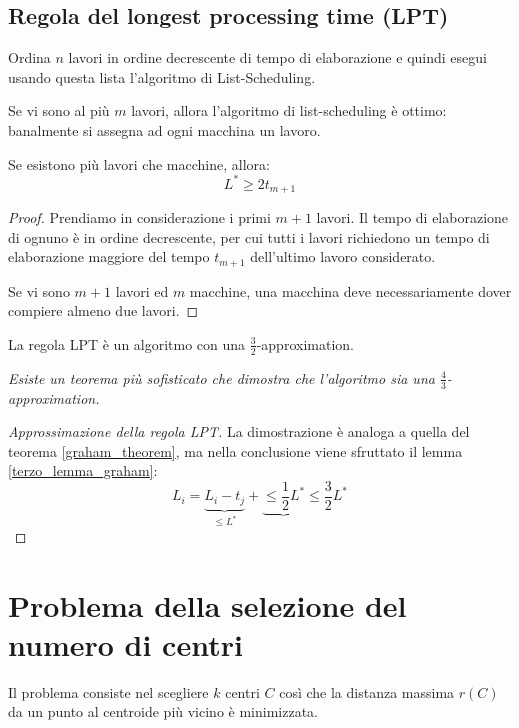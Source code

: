 \documentclass[\main/main.tex]{subfiles}
\begin{document}
\subsection{Regola del longest processing time (LPT)}
Ordina \(n\) lavori in ordine decrescente di tempo di elaborazione e quindi esegui usando questa lista l'algoritmo di List-Scheduling.

\begin{observation}
	Se vi sono al più \(m\) lavori, allora l'algoritmo di list-scheduling è ottimo: banalmente si assegna ad ogni macchina un lavoro.
\end{observation}

\begin{lemma}
	Se esistono più lavori che macchine, allora:
	\[
		L^* \geq 2t_{m+1}
	\]
	\label{terzo_lemma_graham}
\end{lemma}
\begin{proof}
	Prendiamo in considerazione i primi \(m+1\) lavori. Il tempo di elaborazione di ognuno è in ordine decrescente, per cui tutti i lavori richiedono un tempo di elaborazione maggiore del tempo \(t_{m+1}\) dell'ultimo lavoro considerato.

	Se vi sono \(m+1\) lavori ed \(m\) macchine, una macchina deve necessariamente dover compiere almeno due lavori.
\end{proof}

\begin{theorem}
	La regola LPT è un algoritmo con una \(\frac{3}{2}\)-approximation.

	\textit{Esiste un teorema più sofisticato che dimostra che l'algoritmo sia una \(\frac{4}{3}\)-approximation.}
\end{theorem}
\begin{proof}[Approssimazione della regola LPT]
	La dimostrazione è analoga a quella del teorema \ref{graham_theorem}, ma nella conclusione viene sfruttato il lemma \ref{terzo_lemma_graham}:
	\[
		L_i = \underbrace{L_i - t_j}_{\leq L^*} + \underbrace{\leq \frac{1}{2}L^*} \leq \frac{3}{2} L^*
	\]
\end{proof}

\section{Problema della selezione del numero di centri}
Il problema consiste nel scegliere \(k\) centri \(C\) così che la distanza massima \(r(C)\) da un punto al centroide più vicino è minimizzata.
\end{document}
